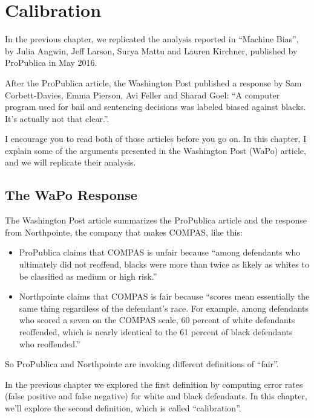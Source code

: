 \hypertarget{calibration}{%
\chapter{Calibration}\label{calibration}}

In the previous chapter, we replicated the analysis reported in
``Machine Bias'', by Julia Angwin, Jeff Larson, Surya Mattu and Lauren
Kirchner, published by ProPublica in May 2016.

After the ProPublica article, the Washington Post published a response
by Sam Corbett-Davies, Emma Pierson, Avi Feller and Sharad Goel: ``A
computer program used for bail and sentencing decisions was labeled
biased against blacks. It's actually not that clear.''.

I encourage you to read both of those articles before you go on. In this
chapter, I explain some of the arguments presented in the Washington
Post (WaPo) article, and we will replicate their analysis.

\hypertarget{the-wapo-response}{%
\section{The WaPo Response}\label{the-wapo-response}}

The Washington Post article summarizes the ProPublica article and the
response from Northpointe, the company that makes COMPAS, like this:

\begin{itemize}
\item
  ProPublica claims that COMPAS is unfair because ``among defendants who
  ultimately did not reoffend, blacks were more than twice as likely as
  whites to be classified as medium or high risk.''
\item
  Northpointe claims that COMPAS is fair because ``scores mean
  essentially the same thing regardless of the defendant's race. For
  example, among defendants who scored a seven on the COMPAS scale, 60
  percent of white defendants reoffended, which is nearly identical to
  the 61 percent of black defendants who reoffended.''
\end{itemize}

So ProPublica and Northpointe are invoking different definitions of
``fair''.

In the previous chapter we explored the first definition by computing
error rates (false positive and false negative) for white and black
defendants. In this chapter, we'll explore the second definition, which
is called ``calibration''.

